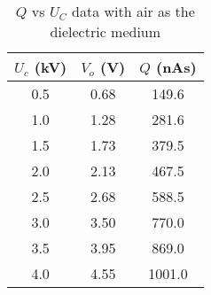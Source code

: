 \begin{table}[H]
    \centering
    \begin{tabular}{|c|c|c|}
    \hline
    $U_c$ (kV)& $V_o$ (V) & $Q$ (nAs) \\ \hline
    0.5 & 0.68  &  149.6 \\
     1.0 & 1.28  &  281.6 \\
     1.5 & 1.73 &  379.5 \\
     2.0 & 2.13 &  467.5 \\
     2.5 & 2.68 &  588.5 \\
     3.0 & 3.50  &  770.0   \\
     3.5 & 3.95  &  869.0   \\
     4.0 & 4.55  & 1001.0   \\
    \hline
    \end{tabular}
    \caption{$Q$ vs $U_C$ data with air as the dielectric medium}
    \label{tab:1}
\end{table}